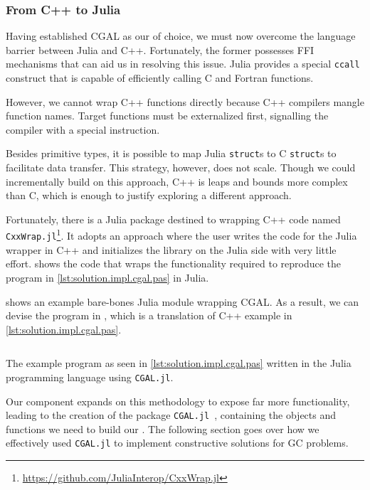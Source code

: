 \subsubsection{From C++ to Julia}%
\label{sec:solution.impl.jlcgal}

Having established \ac{CGAL} as our \geomlibrary{} of choice, we must now
overcome the language barrier between Julia and C++.  Fortunately, the former
possesses \ac{FFI} mechanisms that can aid us in resolving this issue.  Julia
provides a special \texttt{ccall} construct that is capable of
efficiently calling C and Fortran functions.

However, we cannot wrap C++ functions directly because C++ compilers mangle
function names.  Target functions must be externalized first, signalling the
compiler with a special instruction.

Besides primitive types, it is possible to map Julia \texttt{struct}s
to C \texttt{struct}s to facilitate data transfer.  This strategy,
however, does not scale.  Though we could incrementally build on this approach,
C++ is leaps and bounds more complex than C, which is enough to justify
exploring a different approach.

Fortunately, there is a Julia package destined to wrapping C++ code named
\texttt{CxxWrap.jl}\footnote{\url{https://github.com/JuliaInterop/CxxWrap.jl}}.
It adopts an approach where the user writes the code for the Julia wrapper in
C++ and initializes the library on the Julia side with very little effort.
 shows the code that wraps the
functionality required to reproduce the program in
\cref{lst:solution.impl.cgal.pas} in Julia.

 shows an example bare-bones Julia module
wrapping \ac{CGAL}.  As a result, we can devise the program in
, which is a translation of C++ example in
\cref{lst:solution.impl.cgal.pas}.

\begin{listing}[htbp]
  \inputminted{julia}{jl/points_and_segments.jl}
  \caption{\label{lst:solution.impl.jlcgal.pas}
    The example program as seen in \cref{lst:solution.impl.cgal.pas} written in
    the Julia programming language using \texttt{CGAL.jl}.}%
\end{listing}

Our \wrapper{} component expands on this methodology to expose far more
functionality, leading to the creation of the package
\texttt{CGAL.jl}~\cite{Ventura:2021:CGAL.jl},  containing the objects and
functions we need to build our \primitives{}.  The following section goes over
how we effectively used \texttt{CGAL.jl} to implement constructive solutions for
\ac{GC} problems.
